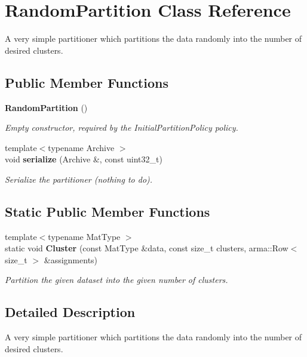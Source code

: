 \section{Random\+Partition Class Reference}
\label{classmlpack_1_1kmeans_1_1RandomPartition}


A very simple partitioner which partitions the data randomly into the number of desired clusters.  


\subsection*{Public Member Functions}
\begin{DoxyCompactItemize}
\item 
\textbf{ Random\+Partition} ()
\begin{DoxyCompactList}\small\item\em Empty constructor, required by the Initial\+Partition\+Policy policy. \end{DoxyCompactList}\item 
{\footnotesize template$<$typename Archive $>$ }\\void \textbf{ serialize} (Archive \&, const uint32\+\_\+t)
\begin{DoxyCompactList}\small\item\em Serialize the partitioner (nothing to do). \end{DoxyCompactList}\end{DoxyCompactItemize}
\subsection*{Static Public Member Functions}
\begin{DoxyCompactItemize}
\item 
{\footnotesize template$<$typename Mat\+Type $>$ }\\static void \textbf{ Cluster} (const Mat\+Type \&data, const size\+\_\+t clusters, arma\+::\+Row$<$ size\+\_\+t $>$ \&assignments)
\begin{DoxyCompactList}\small\item\em Partition the given dataset into the given number of clusters. \end{DoxyCompactList}\end{DoxyCompactItemize}


\subsection{Detailed Description}
A very simple partitioner which partitions the data randomly into the number of desired clusters. 


